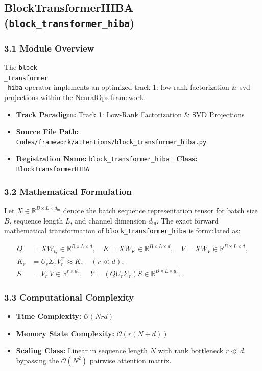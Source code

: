 \subsection{BlockTransformerHIBA (\texttt{block\_transformer\_hiba})}
\label{sec:app_module_block_transformer_hiba}

\subsubsection*{3.1 Module Overview}
The \texttt{block\\_transformer\\_hiba} operator implements an optimized track 1: low-rank factorization \& svd projections within the NeuralOps framework.
\begin{itemize}
    \item \textbf{Track Paradigm:} Track 1: Low-Rank Factorization & SVD Projections
    \item \textbf{Source File Path:} \texttt{Codes/framework/attentions/block\_transformer\_hiba.py}
    \item \textbf{Registration Name:} \texttt{block\_transformer\_hiba} $\mid$ \textbf{Class:} \texttt{BlockTransformerHIBA}
\end{itemize}

\subsubsection*{3.2 Mathematical Formulation}
Let $X \in \mathbb{R}^{B \times L \times d_{\text{in}}}$ denote the batch sequence representation tensor for batch size $B$, sequence length $L$, and channel dimension $d_{\text{in}}$. The exact forward mathematical transformation of \texttt{block\_transformer\_hiba} is formulated as:

\begin{align}
Q &= X W_Q \in \mathbb{R}^{B \times L \times d}, \quad K = X W_K \in \mathbb{R}^{B \times L \times d}, \quad V = X W_V \in \mathbb{R}^{B \times L \times d}, \\
K_r &= U_r \Sigma_r V_r^\top \approx K, \quad (r \ll d), \\
S &= V_r^\top V \in \mathbb{R}^{r \times d_v}, \quad Y = (Q U_r \Sigma_r) S \in \mathbb{R}^{B \times L \times d_v}.
\end{align}


\subsubsection*{3.3 Computational Complexity}
\begin{itemize}
    \item \textbf{Time Complexity:} $\mathcal{O}(N r d)$
    \item \textbf{Memory State Complexity:} $\mathcal{O}(r(N + d))$
    \item \textbf{Scaling Class:} Linear in sequence length $N$ with rank bottleneck $r \ll d$, bypassing the $\mathcal{O}(N^2)$ pairwise attention matrix.
\end{itemize}

